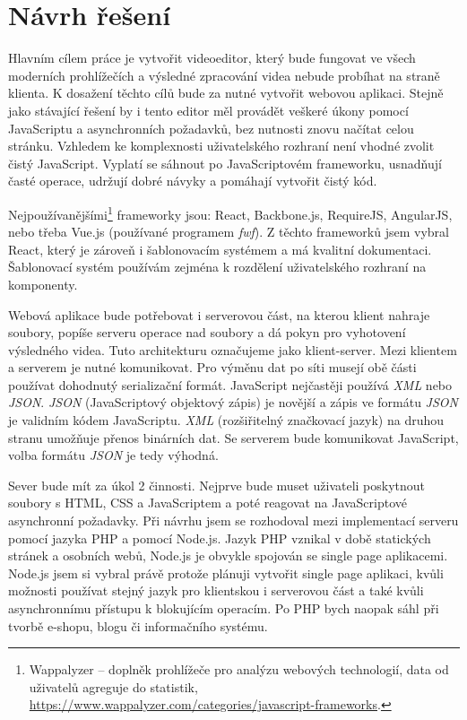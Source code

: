 \chapter{Návrh řešení}
Hlavním cílem práce je vytvořit videoeditor, který bude fungovat ve všech moderních prohlížečích a výsledné zpracování videa nebude probíhat na straně klienta. K dosažení těchto cílů bude za nutné vytvořit webovou aplikaci. Stejně jako stávající řešení by i tento editor měl provádět veškeré úkony pomocí JavaScriptu a asynchronních požadavků, bez nutnosti znovu načítat celou stránku. Vzhledem ke komplexnosti uživatelského rozhraní není vhodné zvolit čistý JavaScript. Vyplatí se sáhnout po JavaScriptovém frameworku, usnadňují časté operace, udržují dobré návyky a pomáhají vytvořit čistý kód.

Nejpoužívanějšími\footnote{Wappalyzer -- doplněk prohlížeče pro analýzu webových technologií, data od uživatelů agreguje do statistik, \url{https://www.wappalyzer.com/categories/javascript-frameworks}.} frameworky jsou: React, Backbone.js, RequireJS, AngularJS, nebo třeba Vue.js (používané programem \textit{fwf}). Z těchto frameworků jsem vybral React, který je zároveň i šablonovacím systémem a má kvalitní dokumentaci. Šablonovací systém používám zejména k rozdělení uživatelského rozhraní na komponenty.

Webová aplikace bude potřebovat i serverovou část, na kterou klient nahraje soubory, popíše serveru operace nad soubory a dá pokyn pro vyhotovení výsledného videa. Tuto architekturu označujeme jako klient-server. Mezi klientem a serverem je nutné komunikovat. Pro výměnu dat po síti musejí obě části používat dohodnutý serializační formát. JavaScript nejčastěji používá \textit{XML} nebo \textit{JSON}. \textit{JSON} (JavaScriptový objektový zápis) je novější a zápis ve formátu \textit{JSON} je validním kódem JavaScriptu. \textit{XML} (rozšiřitelný značkovací jazyk) na druhou stranu umožňuje přenos binárních dat. Se serverem bude komunikovat JavaScript, volba formátu \textit{JSON} je tedy výhodná.

Sever bude mít za úkol 2 činnosti. Nejprve bude muset uživateli poskytnout soubory s HTML, CSS a JavaScriptem a poté reagovat na JavaScriptové asynchronní požadavky. Při návrhu jsem se rozhodoval mezi implementací serveru pomocí jazyka PHP a pomocí Node.js. Jazyk PHP vznikal v době statických stránek a osobních webů, Node.js je obvykle spojován se single page aplikacemi. Node.js jsem si vybral právě protože plánuji vytvořit single page aplikaci, kvůli možnosti používat stejný jazyk pro klientskou i serverovou část a také kvůli asynchronnímu přístupu k blokujícím operacím. Po PHP bych naopak sáhl při tvorbě e-shopu, blogu či informačního systému.

